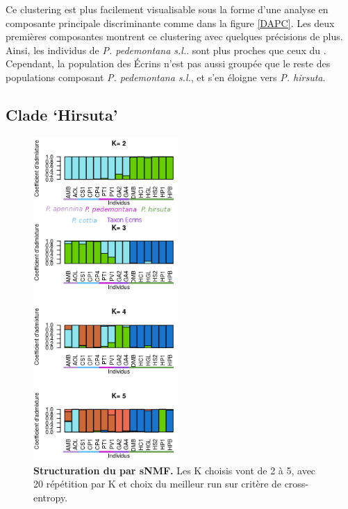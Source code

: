 Ce clustering est plus facilement visualisable sous la forme d'une analyse en composante principale discriminante comme dans la figure \ref{DAPC}. Les deux premières composantes montrent ce clustering avec quelques précisions de plus. Ainsi, les individus de \textit{P. pedemontana s.l.}. sont plus proches que ceux du . Cependant, la population des Écrins n'est pas aussi groupée que le reste des populations composant \textit{P. pedemontana s.l.}, et s'en éloigne vers \textit{P. hirsuta}.

\newpage
\subsection{Clade `Hirsuta'}

\begin{figure}
	\vspace{-40pt}
	\begin{center}
	\includegraphics[width=0.49\textwidth]{fig/structure_hirsuta.png}
	\end{center}
	\caption{\textbf{Structuration du  par sNMF.} Les K choisis vont de 2 à 5, avec 20 répétition par K et choix du meilleur run sur critère de cross-entropy.}
    \label{structure}
    \vspace{-20pt}
\end{figure}


